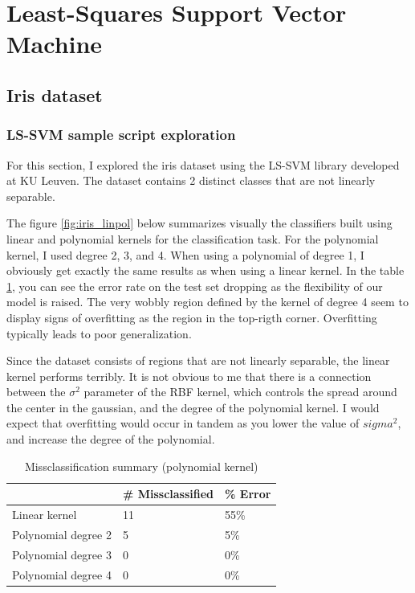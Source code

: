 \documentclass[11pt, a4paper]{article}
\begin{document}
\section{Least-Squares Support Vector Machine}

\subsection{Iris dataset}

\subsubsection{LS-SVM sample script exploration}
For this section, I explored the iris dataset using the LS-SVM library
developed at KU Leuven. The dataset contains 2 distinct classes that
are not linearly separable.

The figure \ref{fig:iris_linpol} below summarizes visually the
classifiers built using linear and polynomial kernels for the
classification task. For the polynomial kernel, I used degree 2, 3,
and 4. When using a polynomial of degree 1, I obviously get exactly
the same results as when using a linear kernel. In the table
\ref{table:iris_linpol}, you can see the error rate on the test set
dropping as the flexibility of our model is raised. The very wobbly
region defined by the kernel of degree 4 seem to display signs of
overfitting as the region in the top-rigth corner. Overfitting
typically leads to poor generalization.

Since the dataset consists of regions that are not linearly separable,
the linear kernel performs terribly. It is not obvious to me that there
is a connection between the $\sigma^2$ parameter of the RBF kernel,
which controls the spread around the center in the gaussian, and the
degree of the polynomial kernel. I would expect that overfitting would
occur in tandem as you lower the value of $sigma^2$, and increase the
degree of the polynomial.

\begin{table}[H]
  \centering
  \begin{tabular}{l|l|l|}
    \cline{2-3}
    & \# Missclassified & \% Error \\ \hline
    \multicolumn{1}{|l|}{Linear kernel}       & 11                & 55\%     \\ \hline
    \multicolumn{1}{|l|}{Polynomial degree 2} & 5                 & 5\%      \\ \hline
    \multicolumn{1}{|l|}{Polynomial degree 3} & 0                 & 0\%      \\ \hline
    \multicolumn{1}{|l|}{Polynomial degree 4} & 0                 & 0\%      \\ \hline
  \end{tabular}
  \caption{Missclassification summary (polynomial kernel)}
  \label{table:iris_linpol}
\end{table}
\end{document}
